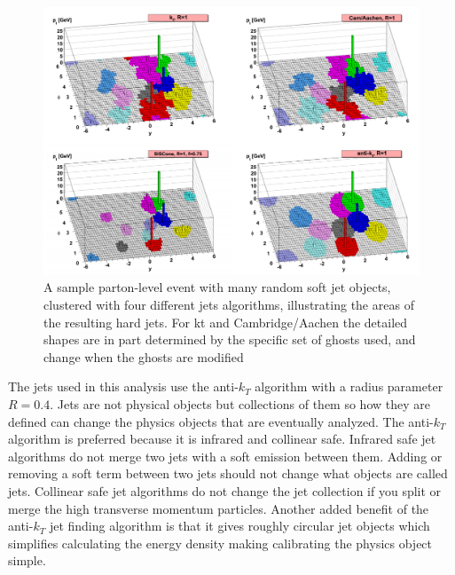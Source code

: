 \begin{figure}[h!]
	\centering
	\includegraphics[width=\columnwidth]{../ThesisImages/Simulation/VarJetAlgs.png}
	\caption[A sample parton-level event with many random soft jet objects, clustered with four different jets algorithms, illustrating the areas of the resulting hard jets. For kt and Cambridge/Aachen the detailed shapes are in part determined by the specific set of ghosts used, and change when the ghosts are modified]{A sample parton-level event with many random soft jet objects, clustered with four different jets algorithms, illustrating the areas of the resulting hard jets. For kt and Cambridge/Aachen the detailed shapes are in part determined by the specific set of ghosts used, and change when the ghosts are modified \cite{antikt} 
	}
	\label{fig:VarJetAlgs}
\end{figure}

The jets used in this analysis use the anti-$k_T$ algorithm \cite{antikt} with a radius parameter $R=0.4$.  Jets are not physical objects but collections of them so how they are defined can change the physics objects that are eventually analyzed.  The anti-$k_T$ algorithm is preferred because it is infrared and collinear safe.  Infrared safe jet algorithms do not merge two jets with a soft emission between them.  Adding or removing a soft term between two jets should not change what objects are called jets.  Collinear safe jet algorithms do not change the jet collection if you split or merge the high transverse momentum particles.  Another added benefit of the anti-$k_T$ jet finding algorithm is that it gives roughly circular jet objects which simplifies calculating the energy density making calibrating the physics object simple.

